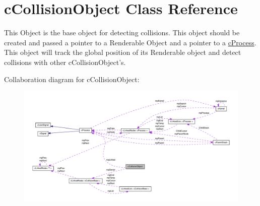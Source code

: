 \hypertarget{classc_collision_object}{
\section{cCollisionObject Class Reference}
\label{classc_collision_object}
}


This Object is the base object for detecting collisions. This object should be created and passed a pointer to a Renderable Object and a pointer to a \hyperlink{classc_process}{cProcess}. This object will track the global position of its Renderable object and detect collisions with other cCollisionObject's.  




Collaboration diagram for cCollisionObject:\nopagebreak
\begin{figure}[H]
\begin{center}
\leavevmode
\includegraphics[width=400pt]{classc_collision_object__coll__graph}
\end{center}
\end{figure}
